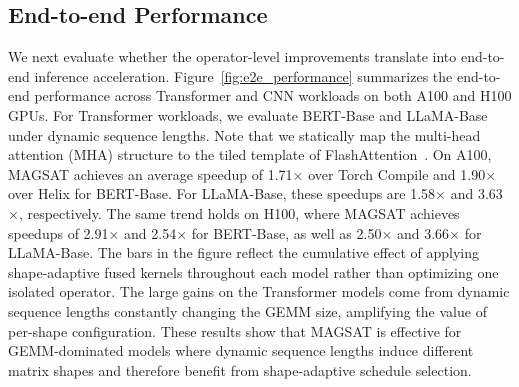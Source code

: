 \subsection{End-to-end Performance}
\label{sec:end2end}

We next evaluate whether the operator-level improvements translate into
end-to-end inference acceleration. 
Figure~\ref{fig:e2e_performance} summarizes the end-to-end performance
across Transformer and CNN workloads on both A100 and H100 GPUs.
For Transformer workloads, we evaluate
BERT-Base and LLaMA-Base under dynamic sequence lengths. 
Note that we statically map the multi-head attention (MHA) structure to the tiled template of FlashAttention~\cite{dao2023flashattention2}.
On A100, MAGSAT achieves an average speedup of 1.71$\times$ over Torch Compile and 1.90$\times$ over Helix for BERT-Base. For LLaMA-Base, these speedups are 1.58$\times$ and 3.63$\times$, respectively. The same trend holds on H100, where MAGSAT achieves speedups of 2.91$\times$ and 2.54$\times$ for BERT-Base, as well as 2.50$\times$ and 3.66$\times$ for LLaMA-Base.
The bars in the figure reflect the cumulative effect of applying
shape-adaptive fused kernels throughout each model rather than optimizing
one isolated operator. 
The large gains on the Transformer models come from dynamic sequence lengths constantly changing the GEMM size, amplifying the value of per-shape configuration.
These results show that MAGSAT is effective for GEMM-dominated models where dynamic sequence lengths induce different
matrix shapes and therefore benefit from shape-adaptive schedule
selection.

